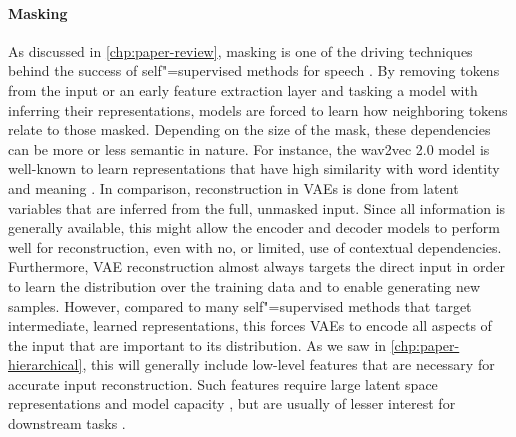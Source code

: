 



\paragraph{Masking} 
As discussed in \cref{chp:paper-review}, masking is one of the driving techniques behind the success of self"=supervised methods for speech \parencite{devlin_bert_2018,baevski_wav2vec_2020}. By removing tokens from the input or an early feature extraction layer and tasking a model with inferring their representations, models are forced to learn how neighboring tokens relate to those masked. Depending on the size of the mask, these dependencies can be more or less semantic in nature. For instance, the wav2vec 2.0 model is well-known to learn representations that have high similarity with word identity and meaning \parencite{pasad_layerwise_2021}. 
In comparison, reconstruction in VAEs is done from latent variables that are inferred from the full, unmasked input. Since all information is generally available, this might allow the encoder and decoder models to perform well for reconstruction, even with no, or limited, use of contextual dependencies. Furthermore, VAE reconstruction almost always targets the direct input in order to learn the distribution over the training data and to enable generating new samples. However, compared to many self"=supervised methods that target intermediate, learned representations, this forces VAEs to encode all aspects of the input that are important to its distribution. As we saw in \cref{chp:paper-hierarchical}, this will generally include low-level features that are necessary for accurate input reconstruction. Such features require large latent space representations and model capacity \parencite{vahdat_nvae_2020,child_very_2021}, but are usually of lesser interest for downstream tasks \parencite{baevski_wav2vec_2020}.

